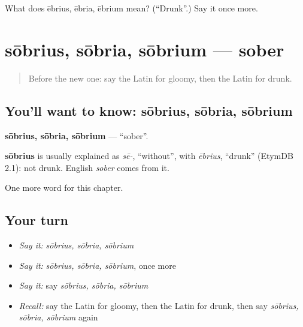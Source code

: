 \begin{tcolorbox}[breakable,colback=teal!4,colframe=teal!35!black,title={Before you move on}]
What does ēbrius, ēbria, ēbrium mean? (\textquotedblleft{}Drunk\textquotedblright{}.) Say it once more.
\end{tcolorbox}
\section[sōbrius, sōbria, sōbrium]{sōbrius, sōbria, sōbrium — sober}

\label{lesson:LA-C269-sobrius}



\begin{quote}
Before the new one: say the Latin for gloomy, then the Latin for drunk.
\end{quote}

\subsection*{You'll want to know: sōbrius, sōbria, sōbrium}
\textbf{sōbrius, sōbria, sōbrium} — \textquotedblleft{}sober\textquotedblright{}.

\begin{cousinweb}
\textbf{sōbrius} is usually explained as \emph{sē-}, \textquotedblleft{}without\textquotedblright{}, with \emph{ēbrius}, \textquotedblleft{}drunk\textquotedblright{} (EtymDB 2.1): not drunk. English \emph{sober} comes from it.
\end{cousinweb}

\begin{grammarlens}[title={What you've built}]
One more word for this chapter.
\end{grammarlens}

\subsection*{Your turn}
\begin{itemize}
\raggedright
  \item \emph{Say it:} \emph{sōbrius, sōbria, sōbrium}
  \item \emph{Say it:} \emph{sōbrius, sōbria, sōbrium}, once more
  \item \emph{Say it:} say \emph{sōbrius, sōbria, sōbrium}
  \item \emph{Recall:} say the Latin for gloomy, then the Latin for drunk, then say \emph{sōbrius, sōbria, sōbrium} again
\end{itemize}

